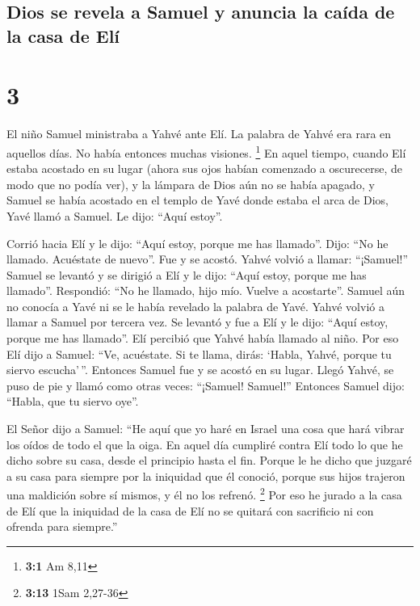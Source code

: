 \hypertarget{dios-se-revela-a-samuel-y-anuncia-la-cauxedda-de-la-casa-de-eluxed}{%
\subsection{Dios se revela a Samuel y anuncia la caída de la casa de
Elí}\label{dios-se-revela-a-samuel-y-anuncia-la-cauxedda-de-la-casa-de-eluxed}}

\hypertarget{section-2}{%
\section{3}\label{section-2}}

 El niño Samuel ministraba a Yahvé ante Elí. La palabra de
Yahvé era rara en aquellos días. No había entonces muchas visiones.
\footnote{\textbf{3:1} Am 8,11}  En aquel tiempo, cuando
Elí estaba acostado en su lugar (ahora sus ojos habían comenzado a
oscurecerse, de modo que no podía ver),  y la lámpara de
Dios aún no se había apagado, y Samuel se había acostado en el templo de
Yavé donde estaba el arca de Dios,  Yavé llamó a Samuel.
Le dijo: ``Aquí estoy''.

 Corrió hacia Elí y le dijo: ``Aquí estoy, porque me has
llamado''. Dijo: ``No he llamado. Acuéstate de nuevo''. Fue y se acostó.
 Yahvé volvió a llamar: ``¡Samuel!'' Samuel se levantó y
se dirigió a Elí y le dijo: ``Aquí estoy, porque me has llamado''.
Respondió: ``No he llamado, hijo mío. Vuelve a acostarte''.
 Samuel aún no conocía a Yavé ni se le había revelado la
palabra de Yavé.  Yahvé volvió a llamar a Samuel por
tercera vez. Se levantó y fue a Elí y le dijo: ``Aquí estoy, porque me
has llamado''. Elí percibió que Yahvé había llamado al niño.
 Por eso Elí dijo a Samuel: ``Ve, acuéstate. Si te llama,
dirás: `Habla, Yahvé, porque tu siervo escucha'\,''. Entonces Samuel fue
y se acostó en su lugar.  Llegó Yahvé, se puso de pie y
llamó como otras veces: ``¡Samuel! Samuel!'' Entonces Samuel dijo:
``Habla, que tu siervo oye''.

 El Señor dijo a Samuel: ``He aquí que yo haré en Israel
una cosa que hará vibrar los oídos de todo el que la oiga.
 En aquel día cumpliré contra Elí todo lo que he dicho
sobre su casa, desde el principio hasta el fin.  Porque
le he dicho que juzgaré a su casa para siempre por la iniquidad que él
conoció, porque sus hijos trajeron una maldición sobre sí mismos, y él
no los refrenó. \footnote{\textbf{3:13} 1Sam 2,27-36} 
Por eso he jurado a la casa de Elí que la iniquidad de la casa de Elí no
se quitará con sacrificio ni con ofrenda para siempre.''

